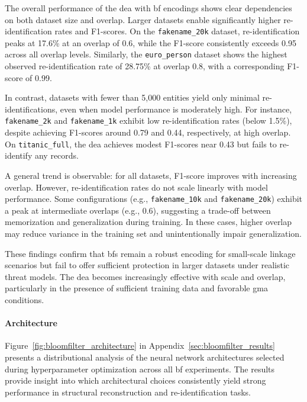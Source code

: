 The overall performance of the \ac{dea} with \ac{bf} encodings shows clear dependencies on both dataset size and overlap.
Larger datasets enable significantly higher re-identification rates and F1-scores.
On the \texttt{fakename\_20k} dataset, re-identification peaks at 17.6\% at an overlap of 0.6, while the F1-score consistently exceeds 0.95 across all overlap levels.
Similarly, the \texttt{euro\_person} dataset shows the highest observed re-identification rate of 28.75\% at overlap 0.8, with a corresponding F1-score of 0.99.

In contrast, datasets with fewer than 5{,}000 entities yield only minimal re-identifications, even when model performance is moderately high.
For instance, \texttt{fakename\_2k} and \texttt{fakename\_1k} exhibit low re-identification rates (below 1.5\%), despite achieving F1-scores around 0.79 and 0.44, respectively, at high overlap.
On \texttt{titanic\_full}, the \ac{dea} achieves modest F1-scores near 0.43 but fails to re-identify any records.

A general trend is observable: for all datasets, F1-score improves with increasing overlap.
However, re-identification rates do not scale linearly with model performance.
Some configurations (e.g., \texttt{fakename\_10k} and \texttt{fakename\_20k}) exhibit a peak at intermediate overlaps (e.g., 0.6), suggesting a trade-off between memorization and generalization during training.
In these cases, higher overlap may reduce variance in the training set and unintentionally impair generalization.

These findings confirm that \ac{bf}s remain a robust encoding for small-scale linkage scenarios but fail to offer sufficient protection in larger datasets under realistic threat models.
The \ac{dea} becomes increasingly effective with scale and overlap, particularly in the presence of sufficient training data and favorable \ac{gma} conditions.


\paragraph{Architecture}

Figure~\ref{fig:bloomfilter_architecture} in Appendix~\ref{sec:bloomfilter_results} presents a distributional analysis of the neural network architectures selected during hyperparameter optimization across all \ac{bf} experiments.
The results provide insight into which architectural choices consistently yield strong performance in structural reconstruction and re-identification tasks.

